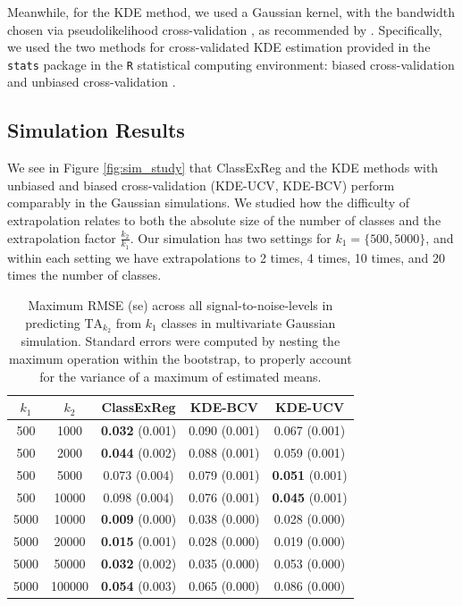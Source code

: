 \documentclass[twoside,11pt]{article}
\begin{document}
Meanwhile, for the KDE method, we used a Gaussian
kernel, with the bandwidth chosen via pseudolikelihood cross-validation \citep{cao1994comparative}, as recommended by
\cite{Kay2008a}.
Specifically, we used the two methods for cross-validated KDE estimation provided in
the {\tt stats} package in the {\tt R} statistical computing
environment: biased cross-validation and unbiased cross-validation \citep{Scott1992}.



\subsection{Simulation Results}

We see in Figure \ref{fig:sim_study} that ClassExReg and the KDE methods with unbiased and biased
cross-validation (KDE-UCV, KDE-BCV) perform comparably in the Gaussian
simulations.  We studied how the difficulty of extrapolation relates to both the
absolute size of the number of classes and the extrapolation factor $\frac{k_2}{k_1}$.  Our simulation has two settings for $k_1 = \{500,5000\}$, and
within each setting we have extrapolations to 2 times, 4 times, 10
times, and 20 times the number of classes.

\begin{table}
\centering
\begin{tabular}{cc||c|c|c}
\hline
$k_1$ & $k_2$ & ClassExReg & KDE-BCV & KDE-UCV \\\hline
500 & 1000 & \textbf{0.032} (0.001) & 0.090 (0.001) & 0.067 (0.001) \\
500 & 2000 & \textbf{0.044} (0.002) & 0.088 (0.001) & 0.059 (0.001) \\
500 & 5000 & 0.073 (0.004) & 0.079 (0.001) & \textbf{0.051} (0.001) \\
500 &10000 & 0.098 (0.004) & 0.076 (0.001) & \textbf{0.045} (0.001) \\\hline
5000 & 10000 & \textbf{0.009} (0.000) & 0.038 (0.000) & 0.028 (0.000) \\
5000 & 20000 & \textbf{0.015} (0.001) & 0.028 (0.000) & 0.019 (0.000) \\
5000 & 50000 & \textbf{0.032} (0.002) & 0.035 (0.000) & 0.053 (0.000) \\
5000 &100000 & \textbf{0.054} (0.003) & 0.065 (0.000) & 0.086 (0.000) \\\hline
\end{tabular}
\caption{Maximum RMSE (se) across all signal-to-noise-levels in
  predicting $\text{TA}_{k_2}$ from $k_1$ classes in multivariate
  Gaussian simulation.  Standard errors were computed by nesting the
  maximum operation within the bootstrap, to properly account for the variance of a maximum of estimated means.}\label{tab:sim_max_error}
\end{table}
\end{document}
